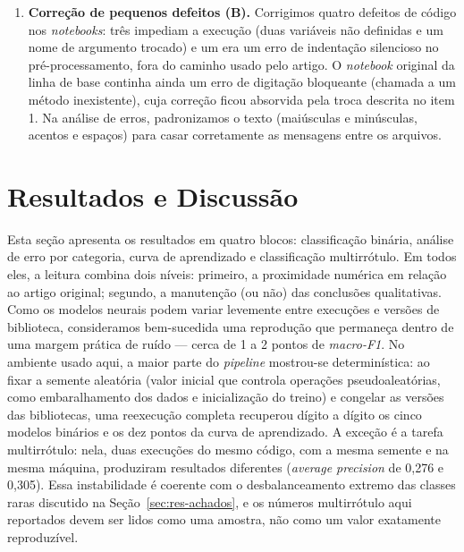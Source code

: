 \documentclass[sigconf, nonacm]{acmart}
\begin{document}
\begin{enumerate}
        usado nos experimentos.
  \item \textbf{Correção de pequenos defeitos \textnormal{(B)}.} Corrigimos
        quatro defeitos de código nos \emph{notebooks}: três impediam a
        execução (duas variáveis não definidas e um nome de argumento
        trocado) e um era um erro de indentação silencioso no
        pré-processamento, fora do caminho usado pelo artigo. O
        \emph{notebook} original da linha de base continha ainda um erro
        de digitação bloqueante (chamada a um método inexistente), cuja
        correção ficou absorvida pela troca descrita no item 1. Na análise
        de erros, padronizamos o texto (maiúsculas e minúsculas, acentos e
        espaços) para casar corretamente as mensagens entre os arquivos.
\end{enumerate}
 

\section{Resultados e Discussão}
\label{sec:resultados}
 
Esta seção apresenta os resultados em quatro blocos: classificação
binária, análise de erro por categoria, curva de aprendizado e
classificação multirrótulo. Em todos eles, a leitura combina dois níveis:
primeiro, a proximidade numérica em relação ao artigo original; segundo, a
manutenção (ou não) das conclusões qualitativas. Como os modelos neurais
podem variar levemente entre execuções e versões de biblioteca, consideramos
bem-sucedida uma reprodução que permaneça dentro de uma margem prática de
ruído --- cerca de 1 a 2 pontos de \emph{macro-F1}. No ambiente usado aqui, a
maior parte do \emph{pipeline} mostrou-se determinística: ao fixar a semente
aleatória (valor inicial que controla operações pseudoaleatórias, como
embaralhamento dos dados e inicialização do treino) e congelar as versões das
bibliotecas, uma reexecução completa recuperou dígito a dígito os cinco modelos
binários e os dez pontos da curva de aprendizado. A exceção é a tarefa
multirrótulo: nela, duas execuções do mesmo código, com a mesma semente e na
mesma máquina, produziram resultados diferentes (\emph{average precision} de
0,276 e 0,305). Essa instabilidade é coerente com o desbalanceamento extremo das
classes raras discutido na Seção~\ref{sec:res-achados}, e os números
multirrótulo aqui reportados devem ser lidos como uma amostra, não como um valor
exatamente reproduzível.
 
\end{document}
